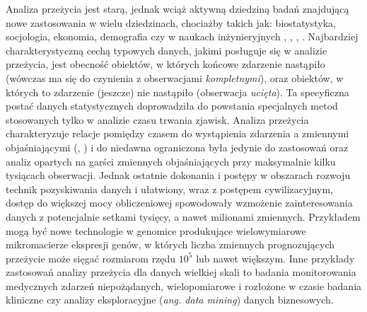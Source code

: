 Analiza przeżycia jest starą, jednak wciąż aktywną dziedziną badań znajdującą nowe zastosowania w wielu dziedzinach, chociażby takich jak: biostatystyka, socjologia, ekonomia, demografia czy w naukach inżynieryjnych \cite{heckman}, \cite{collett}, \cite{boxst}, \cite{hosmer}. Najbardziej charakterystyczną cechą typowych danych, jakimi posługuje się w analizie przeżycia, jest obecność obiektów, w których końcowe zdarzenie nastąpiło (wówczas ma się do czynienia z obserwacjami \textit{kompletnymi}), oraz obiektów, w których to zdarzenie (jeszcze) nie nastąpiło (obserwacja \textit{ucięta}). Ta specyficzna postać danych statystycznych doprowadziła do powstania specjalnych metod stosowanych tylko w analizie czasu trwania zjawisk. Analiza przeżycia charakteryzuje relacje pomiędzy czasem do wystąpienia zdarzenia a zmiennymi objaśniającymi (\cite{kalf}, \cite{oakes}) i do niedawna ograniczona była jedynie do zastosowań oraz analiz opartych na garści zmiennych objaśniających przy maksymalnie kilku tysiącach obserwacji. Jednak ostatnie dokonania i postępy w obszarach rozwoju technik pozyskiwania danych i ułatwiony, wraz z postępem cywilizacyjnym, dostęp do większej mocy obliczeniowej spowodowały wzmożenie zainteresowania danych z potencjalnie setkami tysięcy, a nawet milionami zmiennych. Przykładem mogą być nowe technologie w genomice produkujące wielowymiarowe mikromacierze ekspresji genów, w których liczba zmiennych prognozujących przeżycie może sięgać rozmiarom rzędu $10^5$ lub nawet większym. Inne przykłady zastosowań analizy przeżycia dla danych wielkiej skali to badania monitorowania medycznych zdarzeń niepożądanych, wielopomiarowe i rozłożone w czasie badania kliniczne czy analizy eksploracyjne (\textit{ang. data mining}) danych biznesowych.

